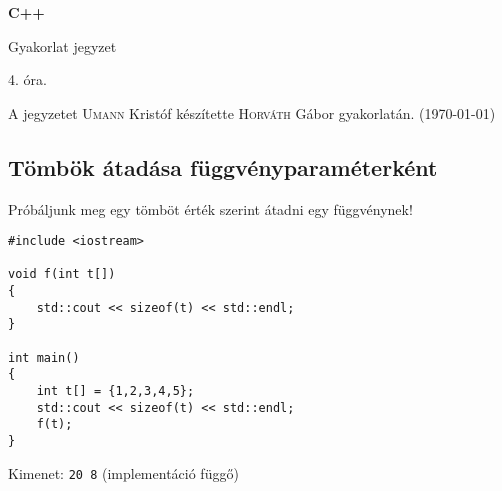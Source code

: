 \documentclass[a4paper,11.5pt,table]{article}
\begin{document}
	\setlength\parindent{0pt}
	\def\<{<\hspace{0mm}<}
	
	\theoremstyle{definition}
	\newtheorem{note}{Megjegyzés}[subsection]
	
	\begin{center}
		{\LARGE\textbf{C++}}
		
		{\Large Gyakorlat jegyzet}
		
		4. óra.
	\end{center}
	A jegyzetet \textsc{Umann} Kristóf készítette \textsc{Horváth} Gábor gyakorlatán. (\today)
	
	\subsection{Tömbök átadása függvényparaméterként}
	Próbáljunk meg egy tömböt érték szerint átadni egy függvénynek!
	\begin{lstlisting}
#include <iostream>

void f(int t[])
{
	std::cout << sizeof(t) << std::endl;
}

int main()
{
	int t[] = {1,2,3,4,5};
	std::cout << sizeof(t) << std::endl;
	f(t);
}
	\end{lstlisting}
	Kimenet: \texttt{20 8} (implementáció függő)
	
\end{document}
